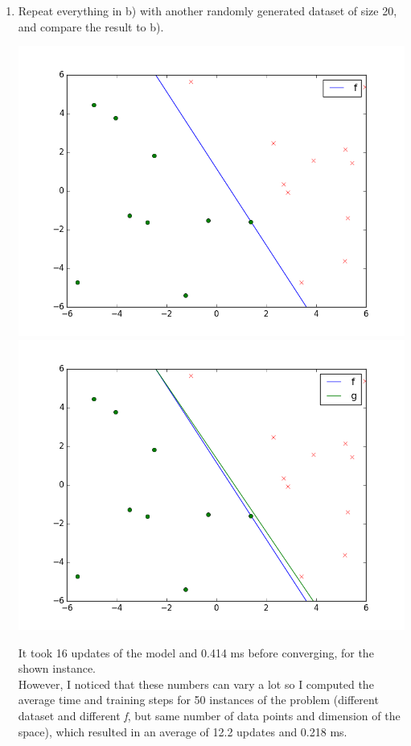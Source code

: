 \documentclass{article}
\begin{document}
\begin{enumerate}[label=(\alph*)]
\item Repeat everything in b) with another randomly generated dataset of size 20, and compare the result to b).
\begin{center}
\includegraphics[scale=0.35]{images/3_a.png} 
\includegraphics[scale=0.35]{images/3_b.png} 
\end{center}
It took 16 updates of the model and 0.414 ms before converging, for the shown instance. \\
However, I noticed that these numbers can vary a lot so I computed the average time and training steps for 50 instances of the problem (different dataset and different \textit{f}, but same number of data points and dimension of the space), which resulted in an average of 12.2 updates and 0.218 ms.


\end{enumerate}
\end{document}
